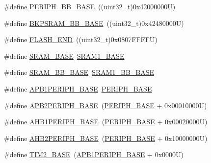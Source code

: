 \begin{DoxyCompactItemize}
\item 
\#define \hyperlink{group___peripheral__registers__structures_gaed7efc100877000845c236ccdc9e144a}{P\+E\+R\+I\+P\+H\+\_\+\+B\+B\+\_\+\+B\+A\+SE}~((uint32\+\_\+t)0x42000000\+U)
\item 
\#define \hyperlink{group___peripheral__registers__structures_gaee19a30c9fa326bb10b547e4eaf4e250}{B\+K\+P\+S\+R\+A\+M\+\_\+\+B\+B\+\_\+\+B\+A\+SE}~((uint32\+\_\+t)0x42480000\+U)
\item 
\#define \hyperlink{group___peripheral__registers__structures_ga8be554f354e5aa65370f6db63d4f3ee4}{F\+L\+A\+S\+H\+\_\+\+E\+ND}~((uint32\+\_\+t)0x0807\+F\+F\+F\+F\+U)
\item 
\#define \hyperlink{group___peripheral__registers__structures_ga05e8f3d2e5868754a7cd88614955aecc}{S\+R\+A\+M\+\_\+\+B\+A\+SE}~\hyperlink{group___peripheral__memory__map_ga7d0fbfb8894012dbbb96754b95e562cd}{S\+R\+A\+M1\+\_\+\+B\+A\+SE}
\item 
\#define \hyperlink{group___peripheral__registers__structures_gad3548b6e2f017f39d399358f3ac98454}{S\+R\+A\+M\+\_\+\+B\+B\+\_\+\+B\+A\+SE}~\hyperlink{group___peripheral__memory__map_gac4c4f61082e4b168f29d9cf97dc3ca5c}{S\+R\+A\+M1\+\_\+\+B\+B\+\_\+\+B\+A\+SE}
\item 
\#define \hyperlink{group___peripheral__registers__structures_ga45666d911f39addd4c8c0a0ac3388cfb}{A\+P\+B1\+P\+E\+R\+I\+P\+H\+\_\+\+B\+A\+SE}~\hyperlink{group___peripheral__memory__map_ga9171f49478fa86d932f89e78e73b88b0}{P\+E\+R\+I\+P\+H\+\_\+\+B\+A\+SE}
\item 
\#define \hyperlink{group___peripheral__registers__structures_ga25b99d6065f1c8f751e78f43ade652cb}{A\+P\+B2\+P\+E\+R\+I\+P\+H\+\_\+\+B\+A\+SE}~(\hyperlink{group___peripheral__memory__map_ga9171f49478fa86d932f89e78e73b88b0}{P\+E\+R\+I\+P\+H\+\_\+\+B\+A\+SE} + 0x00010000\+U)
\item 
\#define \hyperlink{group___peripheral__registers__structures_ga811a9a4ca17f0a50354a9169541d56c4}{A\+H\+B1\+P\+E\+R\+I\+P\+H\+\_\+\+B\+A\+SE}~(\hyperlink{group___peripheral__memory__map_ga9171f49478fa86d932f89e78e73b88b0}{P\+E\+R\+I\+P\+H\+\_\+\+B\+A\+SE} + 0x00020000\+U)
\item 
\#define \hyperlink{group___peripheral__registers__structures_gaeedaa71d22a1948492365e2cd26cfd46}{A\+H\+B2\+P\+E\+R\+I\+P\+H\+\_\+\+B\+A\+SE}~(\hyperlink{group___peripheral__memory__map_ga9171f49478fa86d932f89e78e73b88b0}{P\+E\+R\+I\+P\+H\+\_\+\+B\+A\+SE} + 0x10000000\+U)
\item 
\#define \hyperlink{group___peripheral__registers__structures_ga00d0fe6ad532ab32f0f81cafca8d3aa5}{T\+I\+M2\+\_\+\+B\+A\+SE}~(\hyperlink{group___peripheral__memory__map_ga45666d911f39addd4c8c0a0ac3388cfb}{A\+P\+B1\+P\+E\+R\+I\+P\+H\+\_\+\+B\+A\+SE} + 0x0000\+U)

\end{DoxyCompactItemize}
